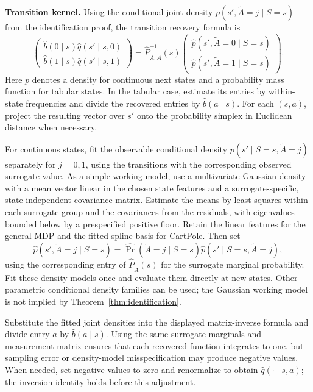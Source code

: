 \documentclass[12pt]{article}
\newcommand{\0}{\boldsymbol{0}}
\begin{document}
\textbf{Transition kernel.}
Using the conditional joint density $p(s',\widetilde A=j\mid S=s)$ from the identification proof, the transition recovery formula is
\[
\begin{pmatrix}
\widehat b(0\mid s)\widehat q(s'\mid s,0)\\
\widehat b(1\mid s)\widehat q(s'\mid s,1)
\end{pmatrix}
=\widehat P_{\widetilde A,A}^{-1}(s)
\begin{pmatrix}
\widehat p(s',\widetilde A=0\mid S=s)\\
\widehat p(s',\widetilde A=1\mid S=s)
\end{pmatrix}.
\]
Here $p$ denotes a density for continuous next states and a probability mass function for tabular states. In the tabular case, estimate its entries by within-state frequencies and divide the recovered entries by $\widehat b(a\mid s)$. For each $(s,a)$, project the resulting vector over $s'$ onto the probability simplex in Euclidean distance when necessary.

For continuous states, fit the observable conditional density $p(s'\mid S=s,\widetilde A=j)$ separately for $j=0,1$, using the transitions with the corresponding observed surrogate value. As a simple working model, use a multivariate Gaussian density with a mean vector linear in the chosen state features and a surrogate-specific, state-independent covariance matrix. Estimate the means by least squares within each surrogate group and the covariances from the residuals, with eigenvalues bounded below by a prespecified positive floor. Retain the linear features for the general MDP and the fitted spline basis for CartPole. Then set
\[
\widehat p(s',\widetilde A=j\mid S=s)
=\widehat{\Pr}(\widetilde A=j\mid S=s)
\widehat p(s'\mid S=s,\widetilde A=j),
\]
using the corresponding entry of $\widehat P_{\widetilde A}(s)$ for the surrogate marginal probability. Fit these density models once and evaluate them directly at new states. Other parametric conditional density families can be used; the Gaussian working model is not implied by Theorem~\ref{thm:identification}.

Substitute the fitted joint densities into the displayed matrix-inverse formula and divide entry $a$ by $\widehat b(a\mid s)$. Using the same surrogate marginals and measurement matrix ensures that each recovered function integrates to one, but sampling error or density-model misspecification may produce negative values. When needed, set negative values to zero and renormalize to obtain $\widehat q(\cdot\mid s,a)$; the inversion identity holds before this adjustment.
\end{document}

